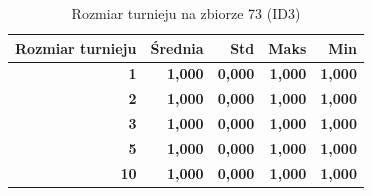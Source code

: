 \begin{table}[htbp]
\centering
\small
\setlength{\tabcolsep}{6pt}
\renewcommand{\arraystretch}{1.2}
\caption{Rozmiar turnieju na zbiorze 73 (ID3)}
\label{tab:ID3_tournament_size_73}
\begin{tabular}{r|r|r|r|r}
\toprule
Rozmiar turnieju & Średnia & Std & Maks & Min \\
\hline
\textbf{1} & \textbf{1,000} & \textbf{0,000} & \textbf{1,000} & \textbf{1,000} \\
\textbf{2} & \textbf{1,000} & \textbf{0,000} & \textbf{1,000} & \textbf{1,000} \\
\textbf{3} & \textbf{1,000} & \textbf{0,000} & \textbf{1,000} & \textbf{1,000} \\
\textbf{5} & \textbf{1,000} & \textbf{0,000} & \textbf{1,000} & \textbf{1,000} \\
\textbf{10} & \textbf{1,000} & \textbf{0,000} & \textbf{1,000} & \textbf{1,000} \\
\bottomrule
\end{tabular}
\end{table}